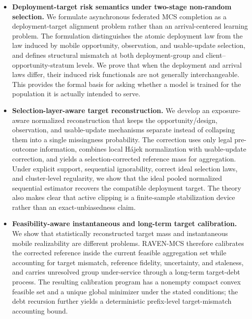 \documentclass[letterpaper,journal]{IEEEtran}
\begin{document}
\begin{itemize}
    \item \textbf{Deployment-target risk semantics under two-stage non-random
    selection.}
    We formulate asynchronous federated MCS completion as a
    deployment-target alignment problem rather than an arrival-centered
    learning problem.  The formulation distinguishes the atomic deployment law
    from the law induced by mobile opportunity, observation, and usable-update
    selection, and defines structural mismatch at both deployment-group and
    client--opportunity-stratum levels.  We prove that when the deployment and
    arrival laws differ, their induced risk functionals are not generally
    interchangeable.  This provides the formal basis for asking whether a model
    is trained for the population it is actually intended to serve.

    \item \textbf{Selection-layer-aware target reconstruction.}
    We develop an exposure-aware normalized reconstruction that keeps the
    opportunity/design, observation, and usable-update mechanisms separate
    instead of collapsing them into a single missingness probability.  The
    correction uses only legal pre-outcome information, combines local
    H\'ajek normalization with usable-update correction, and yields a
    selection-corrected reference mass for aggregation.  Under explicit support,
    sequential ignorability, correct ideal selection laws, and cluster-level
    regularity, we show that the ideal pooled normalized sequential estimator
    recovers the compatible deployment target.  The theory also makes clear
    that active clipping is a finite-sample stabilization device rather than an
    exact-unbiasedness claim.

    \item \textbf{Feasibility-aware instantaneous and long-term target
    calibration.}
    We show that statistically reconstructed target mass and instantaneous
    mobile realizability are different problems.  RAVEN-MCS therefore
    calibrates the corrected reference inside the current feasible aggregation
    set while accounting for target mismatch, reference fidelity, uncertainty,
    and staleness, and carries unresolved group under-service through a
    long-term target-debt process.  The resulting calibration program has a
    nonempty compact convex feasible set and a unique global minimizer under the
    stated conditions; the debt recursion further yields a deterministic
    prefix-level target-mismatch accounting bound.
\end{itemize}
\end{document}
